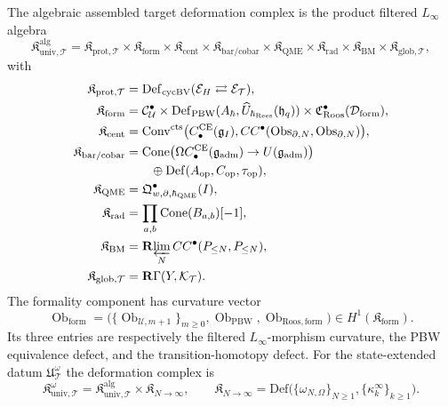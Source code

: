 \begin{defn}
\label{def:completion-universal-deformation-complex}
The algebraic assembled target deformation complex is the product filtered
\(L_\infty\) algebra
\[
  \mathfrak K^{\mathrm{alg}}_{\mathrm{univ},\mathcal T}
  =\mathfrak K_{\mathrm{prot},\mathcal T}
   \times\mathfrak K_{\mathrm{form}}
   \times\mathfrak K_{\mathrm{cent}}
   \times\mathfrak K_{\mathrm{bar/cobar}}
   \times\mathfrak K_{\mathrm{QME}}
   \times\mathfrak K_{\mathrm{rad}}
   \times\mathfrak K_{\mathrm{BM}}
   \times\mathfrak K_{\mathrm{glob},\mathcal T},
\]
with
\[
\begin{aligned}
  \mathfrak K_{\mathrm{prot},\mathcal T}
   &=\mathrm{Def}_{\mathrm{cycBV}}
     (\mathcal E_H\rightleftarrows\mathcal E_{\mathcal T}),\\
  \mathfrak K_{\mathrm{form}}
   &=\mathcal C^\bullet_{\mathcal U}
     \times\mathrm{Def}_{\mathrm{PBW}}
       (A_\hbar,\widehat U_{\hbar_{\mathrm{Rees}}}(\mathfrak h_q))
     \times
       \mathfrak C^\bullet_{\mathrm{Roos}}
       (\mathcal D_{\mathrm{form}}),\\
  \mathfrak K_{\mathrm{cent}}
   &=\mathrm{Conv}^{\mathrm{cts}}\bigl(
     C^{\mathrm{CE}}_\bullet(\mathfrak g_I),
     CC^\bullet(\mathrm{Obs}_{\partial,N},\mathrm{Obs}_{\partial,N})\bigr),\\
  \mathfrak K_{\mathrm{bar/cobar}}
   &=\mathrm{Cone}\bigl(
     \Omega C^{\mathrm{CE}}_\bullet(\mathfrak g_{\mathrm{adm}})
     \to U(\mathfrak g_{\mathrm{adm}})\bigr)\\
   &\qquad{}\oplus
     \mathrm{Def}(A_{\mathrm{op}},C_{\mathrm{op}},\tau_{\mathrm{op}}),\\
  \mathfrak K_{\mathrm{QME}}
   &=\mathfrak Q^\bullet_{w,\partial,\hbar_{\mathrm{QME}}}(I),\\
  \mathfrak K_{\mathrm{rad}}
   &=\prod_{a,b}\mathrm{Cone}(B_{a,b})[-1],\\
  \mathfrak K_{\mathrm{BM}}
   &=\mathbf R\!\varprojlim_N CC^\bullet(P_{\le N},P_{\le N}),\\
  \mathfrak K_{\mathrm{glob},\mathcal T}
   &=\mathbf R\Gamma(Y,\mathcal K_{\mathcal T}).
\end{aligned}
\]
The formality component has curvature vector
\[
  \operatorname{Ob}_{\mathrm{form}}
  =
  \bigl(
    \{\operatorname{Ob}_{\mathcal U,m+1}\}_{m\geq0},
    \operatorname{Ob}_{\mathrm{PBW}},
    \operatorname{Ob}_{\mathrm{Roos,form}}
  \bigr)
  \in H^1(\mathfrak K_{\mathrm{form}}).
\]
Its three entries are respectively the filtered
\(L_\infty\)-morphism curvature, the PBW equivalence defect, and the
transition-homotopy defect.
For the state-extended datum \(\mathfrak U^\omega_{\mathcal T}\) the
deformation complex is
\[
  \mathfrak K^{\omega}_{\mathrm{univ},\mathcal T}
  =
  \mathfrak K^{\mathrm{alg}}_{\mathrm{univ},\mathcal T}
  \times\mathfrak K_{N\to\infty},
  \qquad
  \mathfrak K_{N\to\infty}
   =
   \mathrm{Def}\bigl(\{\omega_{N,\Omega}\}_{N\ge 1},
     \{\kappa^\infty_k\}_{k\ge1}\bigr).
\]
\end{defn}

